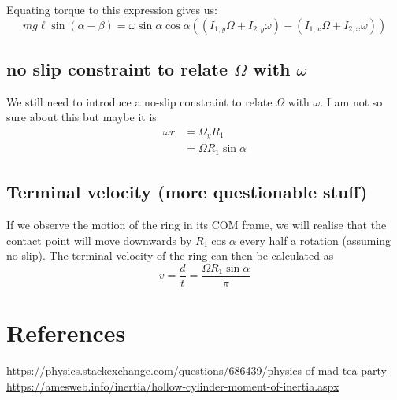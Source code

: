 \documentclass{scrartcl}
\begin{document}
Equating torque to this expression gives us:
\begin{equation}
    mg \ell\sin(\alpha-\beta)=\omega\sin\alpha\cos\alpha ((I_{1,y}\Omega +I_{2,y}\omega)-(I_{1,x}\Omega +I_{2,x}\omega))
\end{equation}

\subsection{no slip constraint to relate $\Omega$ with $\omega$}

We still need to introduce a no-slip constraint to relate $\Omega$ with $\omega$. I am not so sure about this but maybe it is
\begin{equation}
    \begin{aligned}
        \omega r & =  \Omega_y R_1         \\
                 & = \Omega R_1 \sin\alpha
    \end{aligned}
\end{equation}

\subsection{Terminal velocity (more questionable stuff)}
If we observe the motion of the ring in its COM frame, we will realise that the contact point will move downwards by $R_1\cos\alpha$ every half a rotation (assuming no slip). The terminal velocity of the ring can then be calculated as \begin{equation}
    v= \frac{d}{t}= \frac{\Omega R_1 \sin\alpha}{\pi}
\end{equation}

\section{References}
\href{https://physics.stackexchange.com/questions/686439/physics-of-mad-tea-party}{https://physics.stackexchange.com/questions/686439/physics-of-mad-tea-party}
\newline
\href{https://amesweb.info/inertia/hollow-cylinder-moment-of-inertia.aspx}{https://amesweb.info/inertia/hollow-cylinder-moment-of-inertia.aspx}
\end{document}
